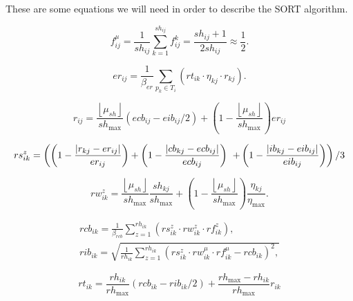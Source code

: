 These are some equations we will need in order to describe the SORT algorithm.


$$
f_{i j}^{\mu}=\frac{1}{s h_{i j}} \sum_{k=1}^{s h_{i j}} f_{i j}^{k}=\frac{s h_{i j}+1}{2 s h_{i j}} \approx \frac{1}{2} .
$$

$$
e r_{i j}=\frac{1}{\beta_{e r}} \sum_{p_{k} \in T_{i}}\left(r t_{i k} \cdot \eta_{k j} \cdot r_{k j}\right) .
$$

$$
r_{i j}=\frac{\left\lfloor\mu_{s h}\right\rfloor}{s h_{\max }}\left(e c b_{i j}-e i b_{i j} / 2\right)+\left(1-\frac{\left\lfloor\mu_{s h}\right\rfloor}{s h_{\max }}\right) e r_{i j}
$$

$$
r s_{i k}^{z}=\left(\left(1-\frac{\left|r_{k j}-e r_{i j}\right|}{e r_{i j}}\right)+\left(1-\frac{\left|c b_{k j}-e c b_{i j}\right|}{e c b_{i j}}\right)\right. \\
\left.+\left(1-\frac{\left|i b_{k j}-e i b_{i j}\right|}{e i b_{i j}}\right)\right) / 3
$$

$$
r w_{i k}^{z}=\frac{\left\lfloor\mu_{s h}\right\rfloor}{s h_{\max }} \frac{s h_{k j}}{s h_{\max }}+\left(1-\frac{\left\lfloor\mu_{s h}\right\rfloor}{s h_{\max }}\right) \frac{\eta_{k j}}{\eta_{\max }} .
$$

\begin{gather}
    r c b_{i k}=\frac{1}{\beta_{r c b}} \sum_{z=1}^{r h_{i k}}\left(r s_{i k}^{z} \cdot r w_{i k}^{z} \cdot r f_{i k}^{z}\right), \\
    r i b_{i k}=\sqrt{\frac{1}{r h_{i k}} \sum_{z=1}^{r h_{i k}}\left(r s_{i k}^{z} \cdot r w_{i k}^{\mu} \cdot r f_{i k}^{\mu}-r c b_{i k}\right)^{2},}
\end{gather}


$$
r t_{i k}=\frac{r h_{i k}}{r h_{\max }}\left(r c b_{i k}-r i b_{i k} / 2\right)+\frac{r h_{\max }-r h_{i k}}{r h_{\max }} r_{i k}
$$
